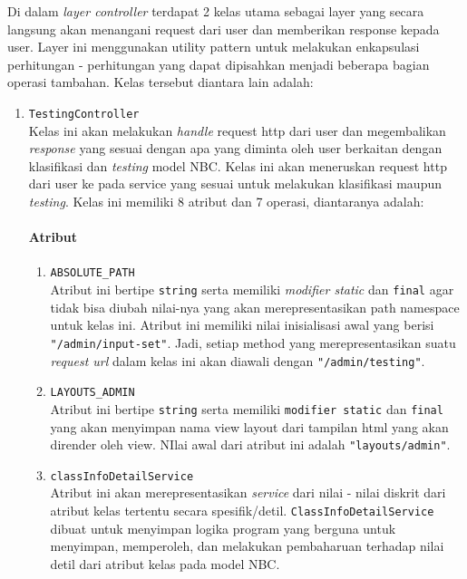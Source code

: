Di dalam \textit{layer controller} terdapat 2 kelas utama sebagai layer yang secara langsung akan menangani request dari user dan memberikan response kepada user. Layer ini menggunakan utility pattern untuk melakukan enkapsulasi perhitungan - perhitungan yang dapat dipisahkan menjadi beberapa bagian operasi tambahan. Kelas tersebut diantara lain adalah:
\begin{enumerate}
	\item \texttt{TestingController}\\
	Kelas ini akan melakukan \textit{handle} request http dari user dan megembalikan \textit{response} yang sesuai dengan apa yang diminta oleh user berkaitan dengan klasifikasi dan \textit{testing} model NBC. Kelas ini akan meneruskan request http dari user ke pada service yang sesuai untuk melakukan klasifikasi maupun \textit{testing}. Kelas ini memiliki 8 atribut dan 7 operasi, diantaranya adalah:
	\paragraph{Atribut}
		\begin{enumerate}
			\item \verb|ABSOLUTE_PATH|\\
			Atribut ini bertipe \texttt{string} serta memiliki \textit{modifier static} dan \texttt{final} agar tidak bisa diubah nilai-nya yang akan merepresentasikan path namespace untuk kelas ini. Atribut ini memiliki nilai inisialisasi awal yang berisi \texttt{"/admin/input-set"}. Jadi, setiap method yang merepresentasikan suatu \textit{request url} dalam kelas ini akan diawali dengan \texttt{"/admin/testing"}.

			\item \verb|LAYOUTS_ADMIN|\\
			Atribut ini bertipe \texttt{string} serta memiliki \texttt{modifier static} dan \texttt{final} yang akan menyimpan nama view layout dari tampilan html yang akan dirender oleh view. NIlai awal dari atribut ini adalah \texttt{"layouts/admin"}.


			\item \texttt{classInfoDetailService}\\
			Atribut ini akan merepresentasikan \textit{service} dari nilai - nilai diskrit dari atribut kelas tertentu secara spesifik/detil. \texttt{ClassInfoDetailService} dibuat untuk menyimpan logika program yang berguna untuk menyimpan, memperoleh, dan melakukan pembaharuan terhadap nilai detil dari atribut kelas pada model NBC.


\end{enumerate}
\end{enumerate}
